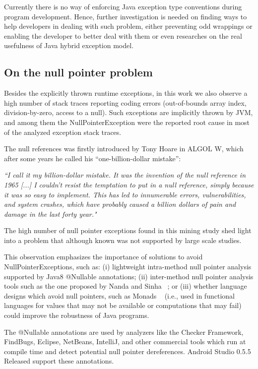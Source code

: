 \documentclass[conference]{IEEEtran}
\begin{document}
Currently there is no way of enforcing Java exception type conventions during program development.
Hence, further investigation is needed on finding ways to help developers in dealing with such
 problem, either preventing odd wrappings or enabling the developer to better deal with them or even
researches on the real usefulness of Java hybrid exception model. 


\subsection{On the null pointer problem}

Besides the explicitly thrown runtime exceptions, in this work we also observe a high number of 
stack traces reporting coding errors (out-of-bounds array index, division-by-zero, access to a null).
Such exceptions are implicitly thrown by JVM, and among them the NullPointerException 
were the reported root cause in most of the analyzed exception stack traces.

The null references was firstly introduced by Tony Hoare in ALGOL W, which after some years he called his “one-billion-dollar mistake”:

\emph{``I call it my billion-dollar mistake. It was the invention of the null reference in 1965 [...] I couldn’t resist the temptation to put 
in a null reference, simply because it was so easy to implement. This has led to innumerable errors, vulnerabilities, and system 
crashes, which have probably caused a billion dollars of pain and damage in the last forty year."}

The high number of null pointer exceptions found in this mining study shed light into a problem
that although known was not supported by large scale studies. 

This observation emphasizes the importance of solutions to avoid NullPointerExceptions, such as:
(i) lightweight intra-method null pointer analysis supported by Java8 @Nullable annotations;
(ii) inter-method null pointer analysis tools such as the one proposed by Nanda and Sinha ~\cite{nanda2009accurate};
or (iii) whether language designs which avoid null pointers, such 
as Monads ~\cite{Walde95} (i.e., used in functional languages for values that may not be available 
or computations that may fail) could improve the robustness of Java programs. 

The @Nullable annotations are used by analyzers like the Checker Framework, FindBugs, Eclipse, 
NetBeans, IntelliJ, and other commercial tools which run at compile time and detect potential null 
pointer dereferences. Android Studio 0.5.5 Released support these annotations.
\end{document}
